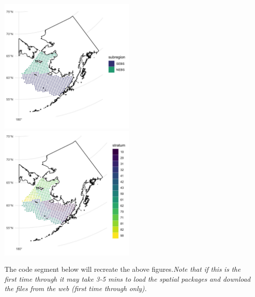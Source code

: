 \documentclass[
]{article}
\begin{document}
\includegraphics[width=0.5\textwidth,height=\textheight]{Figs/stations_NS.jpg}
\includegraphics[width=0.5\textwidth,height=\textheight]{Figs/stations.jpg}

The code segment below will recreate the above figures.\emph{Note that
if this is the first time through it may take 3-5 mins to load the
spatial packages and download the files from the web (first time through
only).}
\end{document}
